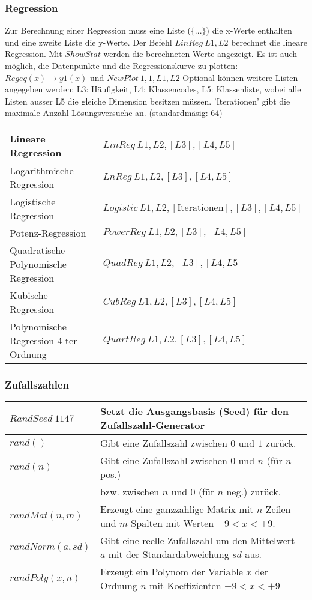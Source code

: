\subsubsection{Regression}
Zur Berechnung einer Regression muss eine Liste ($\{...\}$) die x-Werte enthalten 
und eine zweite Liste die y-Werte. Der Befehl $LinReg \: L1,L2$ berechnet die lineare 
Regression. Mit $ShowStat$ werden die berechneten Werte angezeigt. 
Es ist auch möglich, die Datenpunkte und die Regressionskurve zu plotten: 
$Regeq(x) \to y1(x)$ und $NewPlot \: 1,1,L1,L2$ Optional können weitere Listen 
angegeben werden: L3: Häufigkeit, L4: Klassencodes,  L5: Klassenliste, wobei alle Listen ausser 
L5 die gleiche Dimension besitzen müssen. 'Iterationen' gibt die maximale Anzahl Lösungsversuche an. 
(standardmäsig: 64)\\

\begin{tabular}{|l|l|}
	\hline
	Lineare Regression						&	$LinReg \: L1,L2,[L3],[L4,L5]$ \\ \hline
	Logarithmische Regression				&	$LnReg \: L1,L2,[L3],[L4,L5]$ \\ \hline
	Logistische Regression					&	$Logistic \: L1,L2,[\text{Iterationen}],[L3],[L4,L5]$\\ \hline
	Potenz-Regression						&	$PowerReg \: L1,L2,[L3],[L4,L5]$ \\ \hline
	Quadratische Polynomische Regression	&	$QuadReg \: L1,L2,[L3],[L4,L5]$ \\ \hline
	Kubische Regression						&	$CubReg \: L1,L2,[L3],[L4,L5]$ \\ \hline
	Polynomische Regression 4-ter Ordnung	&	$QuartReg \: L1,L2,[L3],[L4,L5]$ \\ \hline
\end{tabular}

\subsubsection{Zufallszahlen}
\begin{tabular}{|l|l|}
	\hline
	$RandSeed \: 1147$					& Setzt die Ausgangsbasis (Seed) für den Zufallszahl-Generator \\ \hline
	$rand()$							& Gibt eine Zufallszahl zwischen $0$ und $1$ zurück. \\
	$rand(n)$							& Gibt eine Zufallszahl zwischen $0$ und $n$ (für $n$ pos.) \\ 
										& bzw. zwischen $n$ und $0$ (für $n$ neg.) zurück. \\ \hline
	$randMat(n,m)$						& Erzeugt eine ganzzahlige Matrix mit $n$ Zeilen und $m$ Spalten mit Werten $-9<x<+9$. \\ \hline
	$randNorm(a,sd)$					& Gibt eine reelle Zufallszahl um den Mittelwert $a$ mit der Standardabweichung $sd$ aus. \\ \hline
	$randPoly(x,n)$						& Erzeugt ein Polynom der Variable $x$ der Ordnung $n$ mit Koeffizienten $-9<x<+9$ \\ \hline
\end{tabular}